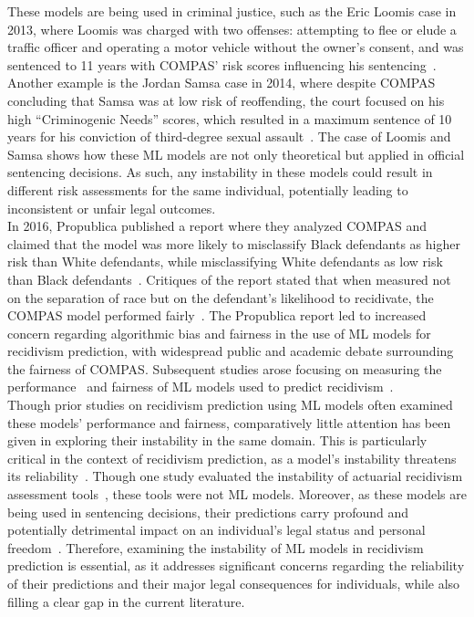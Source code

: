 \documentclass{article}
\begin{document}
These models are being used in criminal justice, such as the Eric Loomis case in 2013, where Loomis was charged with two offenses: attempting to flee or elude a traffic officer and operating a motor vehicle without the owner's consent, and was sentenced to 11 years with COMPAS' risk scores influencing his sentencing~\cite{loomis2016, biddle2022predicting}. Another example is the Jordan Samsa case in 2014, where despite COMPAS concluding that Samsa was at low risk of reoffending, the court focused on his high ``Criminogenic Needs'' scores, which resulted in a maximum sentence of 10 years for his conviction of third-degree sexual assault~\cite{samsa2014}. The case of Loomis and Samsa shows how these ML models are not only theoretical but applied in official sentencing decisions. As such, any instability in these models could result in different risk assessments for the same individual, potentially leading to inconsistent or unfair legal outcomes. \\

In 2016, Propublica published a report where they analyzed COMPAS and claimed that the model was more likely to misclassify Black defendants as higher risk than White defendants, while misclassifying White defendants as low risk than Black defendants~\cite{propublica2016analysis}. Critiques of the report stated that when measured not on the separation of race but on the defendant's likelihood to recidivate, the COMPAS model performed fairly~\cite{dieterich2016compas, corbett2017algorithmic, flores2016false}. The Propublica report led to increased concern regarding algorithmic bias and fairness in the use of ML models for recidivism prediction, with widespread public and academic debate surrounding the fairness of COMPAS. Subsequent studies arose focusing on measuring the performance~\cite{tollenaar2013method, travaini2022machine} and fairness of ML models used to predict recidivism~\cite{dressel2018accuracy, tolan2019machine, wadsworth2018achieving}.\\

Though prior studies on recidivism prediction using ML models often examined these models' performance and fairness, comparatively little attention has been given in exploring their instability in the same domain. This is particularly critical in the context of recidivism prediction, as a model's instability threatens its reliability~\cite{riley2023stability}. Though one study evaluated the instability of actuarial recidivism assessment tools~\cite{helmus2015stability}, these tools were not ML models. Moreover, as these models are being used in sentencing decisions, their predictions carry profound and potentially detrimental impact on an individual's legal status and personal freedom~\cite{van2022predicting}. Therefore, examining the instability of ML models in recidivism prediction is essential, as it addresses significant concerns regarding the reliability of their predictions and their major legal consequences for individuals, while also filling a clear gap in the current literature. \\
\end{document}
